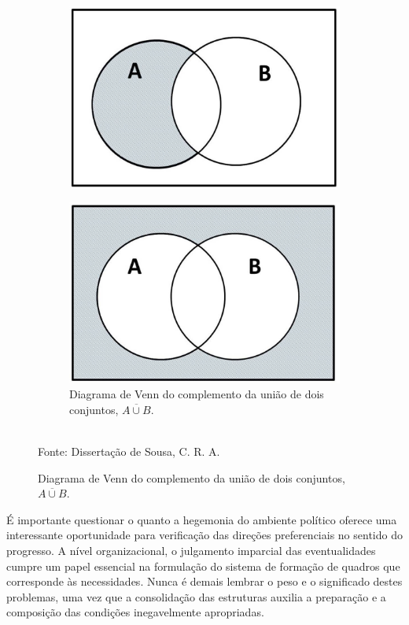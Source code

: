 \documentclass[fleqn]{profmat-cefet}
\begin{document}
\begin{figure}
\begin{subfigure}[t]{0.4\linewidth}
        \label{fig:conjuntos_diferenca}
            \includegraphics[width=.9\linewidth]{figs/conjuntos-diferenca}
    \end{subfigure}%
    \hspace{1cm}
    \begin{subfigure}[t]{0.4\linewidth}
        \centering
        \caption{Diagrama de Venn do complemento da união de dois conjuntos, $\overline{A\cup B}$.}
        \label{fig:conjuntos_complemento_uniao}
            \includegraphics[width=.9\linewidth]{figs/conjuntos-complemento-uniao}
    \end{subfigure}
    \\[2mm] Fonte: Dissertação de Sousa, C. R. A. \cite{SOUZA:Bayesiana}
\end{figure}

É importante questionar o quanto a hegemonia do ambiente político oferece uma
interessante oportunidade para verificação das direções preferenciais no sentido
do progresso. A nível organizacional, o julgamento imparcial das eventualidades
cumpre um papel essencial na formulação do sistema de formação de quadros que
corresponde às necessidades. Nunca é demais lembrar o peso e o significado
destes problemas, uma vez que a consolidação das estruturas auxilia a preparação
e a composição das condições inegavelmente apropriadas. 
\end{document}
